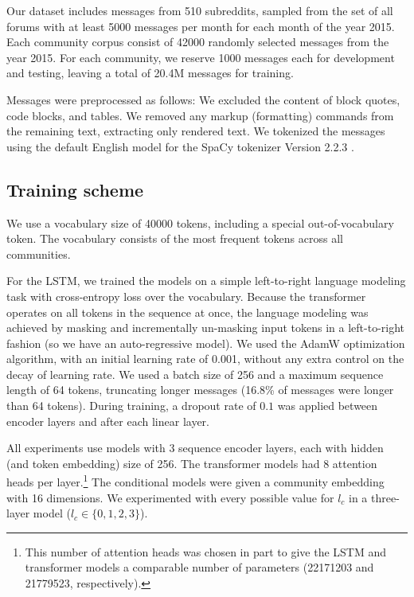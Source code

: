 \documentclass[11pt]{article}
\begin{document}
Our dataset includes messages from \num{510} subreddits, 
sampled from the set of all forums 
with at least \num{5000} messages per month for each month
of the year 2015.
Each community corpus consist of \num{42000} randomly selected messages from the year 2015.
For each community, we reserve \num{1000} messages each for development and testing,
leaving a total of \num{20.4}M messages for training.

Messages were preprocessed as follows: 
We excluded the content of block quotes, code blocks, and tables.
We removed any markup (formatting) commands from the remaining text, 
extracting only rendered text.
We tokenized the messages using the default English model for the SpaCy tokenizer 
Version 2.2.3 \citep{Honnibal2017}.


\subsection{Training scheme}

We use a vocabulary size of \num{40000} tokens, including a special
out-of-vocabulary token.  The vocabulary consists of the most frequent
tokens across all communities.

For the LSTM, we trained the models on a simple left-to-right language
modeling task with cross-entropy loss over the vocabulary.  Because
the transformer operates on all tokens in the sequence at once, the
language modeling was achieved by masking and incrementally un-masking
input tokens in a left-to-right fashion (so we have an
auto-regressive model).  We used the AdamW
\citep{Loshchilov2019} optimization algorithm, with an initial
learning rate of \num{0.001}, without any extra control on the decay
of learning rate.
%
We used a batch size of \num{256} and a maximum sequence length of
\num{64} tokens, truncating longer messages (16.8\% of messages were
longer than \num{64} tokens).  During training, a dropout rate of
$0.1$ was applied between encoder layers and after each linear layer.

All experiments use models with \num{3} sequence encoder layers,
each with hidden (and token embedding) size of \num{256}. 
The transformer models had \num{8} attention heads per layer.\footnote{
  This number of attention heads was chosen in part to give the LSTM and transformer
  models a comparable number of parameters 
  (\num{22171203} and \num{21779523}, respectively).}
The conditional models were given a community embedding with \num{16} dimensions. 
We experimented with every possible value for $l_c$ in a three-layer model ($l_c\in\{0,1,2,3\}$).
\end{document}
